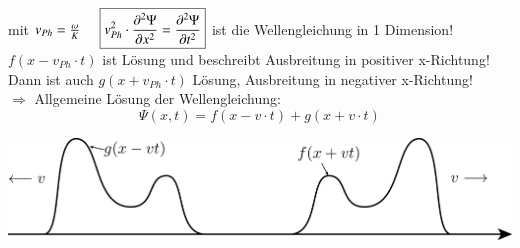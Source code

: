 mit $ v_{Ph} = \frac{\omega}{K} \hspace{5mm} \boxed{v^2_{Ph} \cdot \frac{\partial^2\Psi}{\partial x^2} = \frac{\partial^2\Psi}{\partial t^2}} $ ist die Wellengleichung in 1 Dimension! \\

$ f (x-v_{Ph} \cdot t) $ ist Lösung und beschreibt Ausbreitung in positiver x-Richtung!\\
Dann ist auch $ g(x+v_{Ph} \cdot t) $ Lösung, Ausbreitung in negativer x-Richtung!\\
\break
$ \Rightarrow $ Allgemeine Lösung der Wellengleichung:
$$ \Psi(x,t) = f(x-v\cdot t) + g(x+v\cdot t) $$
\begin{center}
	\includegraphics[width=0.7\linewidth]{skizzen/19/19B11}
\end{center}